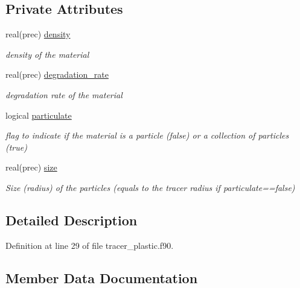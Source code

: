 \subsection*{Private Attributes}
\begin{DoxyCompactItemize}
\item 
real(prec) \mbox{\hyperlink{structtracer__plastic__mod_1_1plastic__par__class_af2f2bccb38cd0cd010f86091e36e8f3d}{density}}
\begin{DoxyCompactList}\small\item\em density of the material \end{DoxyCompactList}\item 
real(prec) \mbox{\hyperlink{structtracer__plastic__mod_1_1plastic__par__class_ae693d6112d2600408a274273d53c397e}{degradation\+\_\+rate}}
\begin{DoxyCompactList}\small\item\em degradation rate of the material \end{DoxyCompactList}\item 
logical \mbox{\hyperlink{structtracer__plastic__mod_1_1plastic__par__class_afbec8826947883ba3d3c5bc29759a80c}{particulate}}
\begin{DoxyCompactList}\small\item\em flag to indicate if the material is a particle (false) or a collection of particles (true) \end{DoxyCompactList}\item 
real(prec) \mbox{\hyperlink{structtracer__plastic__mod_1_1plastic__par__class_a4436f491c11ebd046b3a74987ff71eee}{size}}
\begin{DoxyCompactList}\small\item\em Size (radius) of the particles (equals to the tracer radius if particulate==false) \end{DoxyCompactList}\end{DoxyCompactItemize}


\subsection{Detailed Description}


Definition at line 29 of file tracer\+\_\+plastic.\+f90.



\subsection{Member Data Documentation}
\mbox{\label{structtracer__plastic__mod_1_1plastic__par__class_ae693d6112d2600408a274273d53c397e}} 
